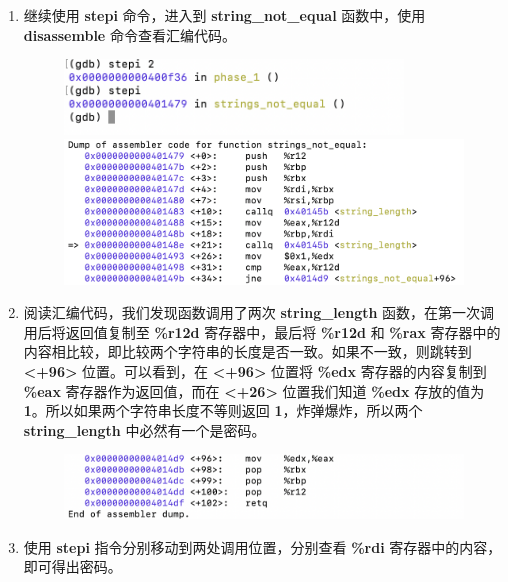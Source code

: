 \begin{enumerate}
\begin{figure}[htbp]
                \end{figure}
            \item 继续使用 \textbf{stepi} 命令，进入到 \textbf{string\_not\_equal} 函数中，使用 \textbf{disassemble} 命令查看汇编代码。
                \begin{figure}[htbp]
                    \hspace*{1.7cm}
                    \includegraphics*[width = 9cm]{s1_6.png} \\
                    \hspace*{1.3cm}
                    \includegraphics*[width = 11cm]{s1_7.png}
                \end{figure}
            \item 阅读汇编代码，我们发现函数调用了两次 \textbf{string\_length} 函数，在第一次调用后将返回值复制至 \textbf{\%r12d} 寄存器中，最后将 \textbf{\%r12d} 和 \textbf{\%rax} 寄存器中的内容相比较，即比较两个字符串的长度是否一致。如果不一致，则跳转到 \textbf{<+96>} 位置。可以看到，在 \textbf{<+96>} 位置将 \textbf{\%edx} 寄存器的内容复制到 \textbf{\%eax} 寄存器作为返回值，而在 \textbf{<+26>} 位置我们知道 \textbf{\%edx} 存放的值为 \textbf{1}。所以如果两个字符串长度不等则返回 \textbf{1}，炸弹爆炸，所以两个 \textbf{string\_length} 中必然有一个是密码。
                \begin{figure}[htbp]
                    \centering
                    \includegraphics*[width = 12cm]{s1_7_1.png}
                \end{figure}
            \item 使用 \textbf{stepi} 指令分别移动到两处调用位置，分别查看 \textbf{\%rdi} 寄存器中的内容，即可得出密码。

\end{enumerate}
